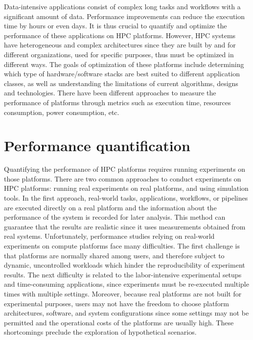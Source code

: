 Data-intensive applications consist of complex long tasks and workflows 
with a significant amount of data. 
Performance improvements can reduce the execution time by hours or even days.
It is thus crucial to quantify and optimize the performance of these applications 
on HPC platforms. 
However, HPC systems have heterogeneous and complex architectures since they 
are built by and for different organizations, used for specific purposes, thus must be 
optimized in different ways. 
The goals of optimization of these platforms include determining which type of 
hardware/software stacks are best suited to different application classes, 
as well as understanding the limitations of current algorithms, 
designs and technologies. 
There have been different approaches to measure the performance 
of platforms through metrics such as execution time, 
resources consumption, power consumption, etc. 

\section{Performance quantification}

Quantifying the performance of HPC platforms requires running experiments on those platforms. 
There are two common approaches to conduct experiments on HPC platforms:
running real experiments on real platforms, and using simulation tools. 
In the first approach, real-world tasks, applications, workflows, or pipelines are executed 
directly on a real platform and the information about the performance of the system 
is recorded for later analysis. 
This method can guarantee that the results are realistic since it uses measurements 
obtained from real systems.
Unfortunately, performance studies relying on real-world experiments on 
compute platforms face many difficulties.
The first challenge is that platforms are normally shared among users, and therefore subject to dynamic, uncontrolled workloads which
 hinder the reproducibility 
of experiment results.
The next difficulty is related to the labor-intensive experimental setups and 
time-consuming applications, since experiments must be re-executed 
multiple times with multiple settings. 
Moreover, because real platforms are not built for experimental purposes,
users may not have the freedom to choose platform architectures, software, and 
system configurations since some settings may not be permitted and the 
operational costs of the platforms are usually high. 
These shortcomings preclude the exploration of hypothetical scenarios.

